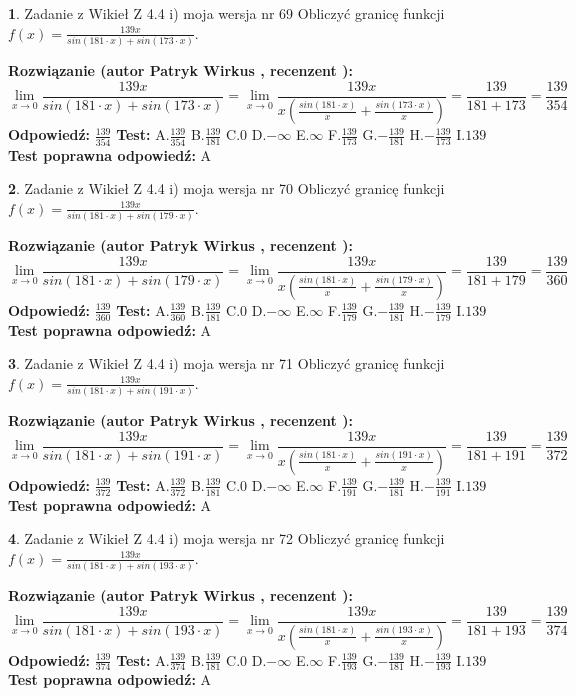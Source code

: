\documentclass[12pt, a4paper]{article}
\theoremstyle{definition} %
\newtheorem{zad}{}
\newcommand{\zadStart}[1]{\begin{zad}#1\newline}
\newcommand{\zadStop}{\end{zad}}
\newcommand{\rozwStart}[2]{\noindent \textbf{Rozwiązanie (autor #1 , recenzent #2): }\newline}
\newcommand{\rozwStop}{\newline}
\newcommand{\odpStart}{\noindent \textbf{Odpowiedź:}\newline}
\newcommand{\odpStop}{\newline}
\newcommand{\testStart}{\noindent \textbf{Test:}\newline}
\newcommand{\testStop}{\newline}
\newcommand{\kluczStart}{\noindent \textbf{Test poprawna odpowiedź:}\newline}
\newcommand{\kluczStop}{\newline}
\begin{document}
\zadStart{Zadanie z Wikieł Z 4.4 i) moja wersja nr 69}
Obliczyć granicę funkcji $f(x)=\frac{139x}{sin(181\cdot x) +sin(173\cdot x)}$.
\zadStop
\rozwStart{Patryk Wirkus}{}
$$\lim\limits_{x\to 0}\frac{139x}{sin(181\cdot x) +sin(173\cdot x)}=\lim\limits_{x\to 0}\frac{139x}{x(\frac{sin(181\cdot x)}{x}+\frac{sin(173\cdot x)}{x})}=\frac{139}{181+173} = \frac{139}{354}$$
\rozwStop
\odpStart
$\frac{139}{354}$
\odpStop
\testStart
A.$\frac{139}{354}$
B.$\frac{139}{181}$
C.$0$
D.$-\infty$
E.$\infty$
F.$\frac{139}{173}$
G.$-\frac{139}{181}$
H.$-\frac{139}{173}$
I.$139$
\testStop
\kluczStart
A
\kluczStop



\zadStart{Zadanie z Wikieł Z 4.4 i) moja wersja nr 70}
Obliczyć granicę funkcji $f(x)=\frac{139x}{sin(181\cdot x) +sin(179\cdot x)}$.
\zadStop
\rozwStart{Patryk Wirkus}{}
$$\lim\limits_{x\to 0}\frac{139x}{sin(181\cdot x) +sin(179\cdot x)}=\lim\limits_{x\to 0}\frac{139x}{x(\frac{sin(181\cdot x)}{x}+\frac{sin(179\cdot x)}{x})}=\frac{139}{181+179} = \frac{139}{360}$$
\rozwStop
\odpStart
$\frac{139}{360}$
\odpStop
\testStart
A.$\frac{139}{360}$
B.$\frac{139}{181}$
C.$0$
D.$-\infty$
E.$\infty$
F.$\frac{139}{179}$
G.$-\frac{139}{181}$
H.$-\frac{139}{179}$
I.$139$
\testStop
\kluczStart
A
\kluczStop



\zadStart{Zadanie z Wikieł Z 4.4 i) moja wersja nr 71}
Obliczyć granicę funkcji $f(x)=\frac{139x}{sin(181\cdot x) +sin(191\cdot x)}$.
\zadStop
\rozwStart{Patryk Wirkus}{}
$$\lim\limits_{x\to 0}\frac{139x}{sin(181\cdot x) +sin(191\cdot x)}=\lim\limits_{x\to 0}\frac{139x}{x(\frac{sin(181\cdot x)}{x}+\frac{sin(191\cdot x)}{x})}=\frac{139}{181+191} = \frac{139}{372}$$
\rozwStop
\odpStart
$\frac{139}{372}$
\odpStop
\testStart
A.$\frac{139}{372}$
B.$\frac{139}{181}$
C.$0$
D.$-\infty$
E.$\infty$
F.$\frac{139}{191}$
G.$-\frac{139}{181}$
H.$-\frac{139}{191}$
I.$139$
\testStop
\kluczStart
A
\kluczStop



\zadStart{Zadanie z Wikieł Z 4.4 i) moja wersja nr 72}
Obliczyć granicę funkcji $f(x)=\frac{139x}{sin(181\cdot x) +sin(193\cdot x)}$.
\zadStop
\rozwStart{Patryk Wirkus}{}
$$\lim\limits_{x\to 0}\frac{139x}{sin(181\cdot x) +sin(193\cdot x)}=\lim\limits_{x\to 0}\frac{139x}{x(\frac{sin(181\cdot x)}{x}+\frac{sin(193\cdot x)}{x})}=\frac{139}{181+193} = \frac{139}{374}$$
\rozwStop
\odpStart
$\frac{139}{374}$
\odpStop
\testStart
A.$\frac{139}{374}$
B.$\frac{139}{181}$
C.$0$
D.$-\infty$
E.$\infty$
F.$\frac{139}{193}$
G.$-\frac{139}{181}$
H.$-\frac{139}{193}$
I.$139$
\testStop
\kluczStart
A
\kluczStop
\end{document}
